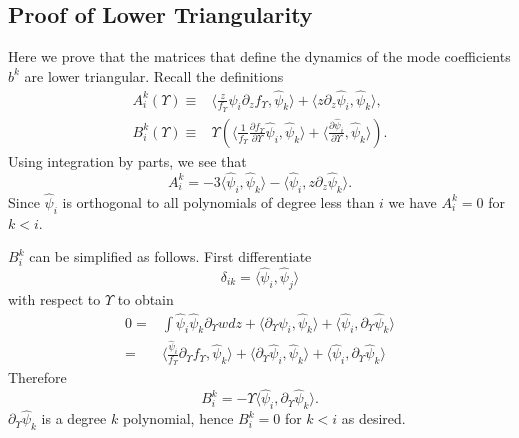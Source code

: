\begin{subappendices}
\subsection{Proof of Lower Triangularity}\label{lower_triang}
Here we prove that the matrices that define the dynamics of the mode coefficients $b^k$ are lower triangular.  Recall the definitions
\begin{align}
A^k_i(\Upsilon)\equiv&\langle\frac{z}{f_\Upsilon }\hat\psi_i\partial_zf_\Upsilon ,\hat\psi_k\rangle+\langle z\partial_z \hat\psi_i,\hat\psi_k\rangle,\\
B^k_i(\Upsilon)\equiv &\Upsilon\left(\langle\frac{1}{f_\Upsilon }\frac{\partial f_\Upsilon }{\partial\Upsilon}\hat\psi_i,\hat\psi_k\rangle+\langle\frac{\partial\hat{\psi}_i}{\partial \Upsilon},\hat\psi_k\rangle\right).
\end{align}
Using integration by parts, we see that
\begin{equation}
A^k_i=-3\langle\hat\psi_i,\hat\psi_k\rangle-\langle \hat \psi_i,z\partial_z\hat\psi_k\rangle.
\end{equation}
Since $\hat\psi_i$ is orthogonal to all polynomials of degree less than $i$ we have $A^k_i=0$ for  $k<i$.  

$B^k_i$ can be simplified as follows.  First differentiate 
\begin{equation}
\delta_{ik}=\langle \hat\psi_i,\hat\psi_j\rangle
\end{equation}
with respect to $\Upsilon$ to obtain
\begin{align}
0=&\int \hat\psi_i\hat\psi_k\partial_{\Upsilon}wdz+\langle \partial_{\Upsilon}\hat\psi_i,\hat\psi_k\rangle+\langle \hat\psi_i,\partial_{\Upsilon}\hat\psi_k\rangle\\
=&\langle\frac{\hat\psi_i}{f_\Upsilon}\partial_{\Upsilon}f_\Upsilon,\hat\psi_k \rangle+\langle\partial_{\Upsilon}\hat\psi_i,\hat\psi_k\rangle+\langle \hat\psi_i,\partial_{\Upsilon}\hat\psi_k\rangle
\end{align}
Therefore 
\begin{equation}
B^k_i=-\Upsilon\langle\hat\psi_i,\partial_{\Upsilon}\hat\psi_k\rangle.
\end{equation}
$\partial_\Upsilon \hat\psi_k$ is a degree $k$ polynomial, hence $B_i^k=0$ for $k<i$ as desired.


\end{subappendices}
